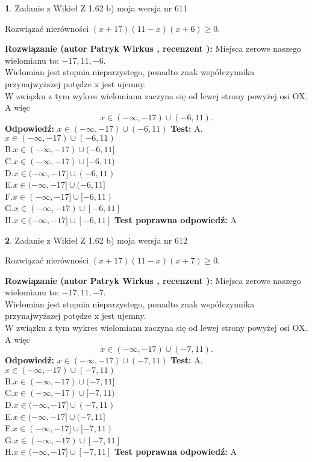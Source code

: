 \documentclass[12pt, a4paper]{article}
\theoremstyle{definition} %
\newtheorem{zad}{}
\newcommand{\zadStart}[1]{\begin{zad}#1\newline}
\newcommand{\zadStop}{\end{zad}}
\newcommand{\rozwStart}[2]{\noindent \textbf{Rozwiązanie (autor #1 , recenzent #2): }\newline}
\newcommand{\rozwStop}{\newline}
\newcommand{\odpStart}{\noindent \textbf{Odpowiedź:}\newline}
\newcommand{\odpStop}{\newline}
\newcommand{\testStart}{\noindent \textbf{Test:}\newline}
\newcommand{\testStop}{\newline}
\newcommand{\kluczStart}{\noindent \textbf{Test poprawna odpowiedź:}\newline}
\newcommand{\kluczStop}{\newline}
\begin{document}
\zadStart{Zadanie z Wikieł Z 1.62 b) moja wersja nr 611}

Rozwiązać nierówności $(x+17)(11-x)(x+6)\ge0$.
\zadStop
\rozwStart{Patryk Wirkus}{}
Miejsca zerowe naszego wielomianu to: $-17, 11, -6$.\\
Wielomian jest stopnia nieparzystego, ponadto znak współczynnika przy\linebreak najwyższej potędze x jest ujemny.\\ W związku z tym wykres wielomianu zaczyna się od lewej strony powyżej osi OX. A więc $$x \in (-\infty,-17) \cup (-6,11).$$
\rozwStop
\odpStart
$x \in (-\infty,-17) \cup (-6,11)$
\odpStop
\testStart
A.$x \in (-\infty,-17) \cup (-6,11)$\\
B.$x \in (-\infty,-17) \cup (-6,11]$\\
C.$x \in (-\infty,-17) \cup [-6,11)$\\
D.$x \in (-\infty,-17] \cup (-6,11)$\\
E.$x \in (-\infty,-17] \cup (-6,11]$\\
F.$x \in (-\infty,-17] \cup [-6,11)$\\
G.$x \in (-\infty,-17) \cup [-6,11]$\\
H.$x \in (-\infty,-17] \cup [-6,11]$
\testStop
\kluczStart
A
\kluczStop



\zadStart{Zadanie z Wikieł Z 1.62 b) moja wersja nr 612}

Rozwiązać nierówności $(x+17)(11-x)(x+7)\ge0$.
\zadStop
\rozwStart{Patryk Wirkus}{}
Miejsca zerowe naszego wielomianu to: $-17, 11, -7$.\\
Wielomian jest stopnia nieparzystego, ponadto znak współczynnika przy\linebreak najwyższej potędze x jest ujemny.\\ W związku z tym wykres wielomianu zaczyna się od lewej strony powyżej osi OX. A więc $$x \in (-\infty,-17) \cup (-7,11).$$
\rozwStop
\odpStart
$x \in (-\infty,-17) \cup (-7,11)$
\odpStop
\testStart
A.$x \in (-\infty,-17) \cup (-7,11)$\\
B.$x \in (-\infty,-17) \cup (-7,11]$\\
C.$x \in (-\infty,-17) \cup [-7,11)$\\
D.$x \in (-\infty,-17] \cup (-7,11)$\\
E.$x \in (-\infty,-17] \cup (-7,11]$\\
F.$x \in (-\infty,-17] \cup [-7,11)$\\
G.$x \in (-\infty,-17) \cup [-7,11]$\\
H.$x \in (-\infty,-17] \cup [-7,11]$
\testStop
\kluczStart
A
\kluczStop
\end{document}

